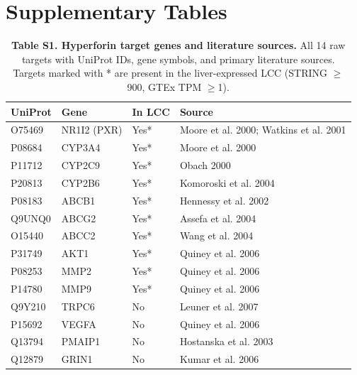 \clearpage
\section*{Supplementary Tables}

\begin{table}[ht]
\centering
\caption{\textbf{Table S1. Hyperforin target genes and literature sources.}
All 14 raw targets with UniProt IDs, gene symbols, and primary literature sources.
Targets marked with * are present in the liver-expressed LCC (STRING $\geq$900, GTEx TPM $\geq$1).}
\label{tab:S1}
\vspace{0.5em}
\small
\begin{tabular}{llll}
\toprule
\textbf{UniProt} & \textbf{Gene} & \textbf{In LCC} & \textbf{Source} \\
\midrule
O75469 & NR1I2 (PXR) & Yes* & Moore et al. 2000; Watkins et al. 2001 \\
P08684 & CYP3A4 & Yes* & Moore et al. 2000 \\
P11712 & CYP2C9 & Yes* & Obach 2000 \\
P20813 & CYP2B6 & Yes* & Komoroski et al. 2004 \\
P08183 & ABCB1 & Yes* & Hennessy et al. 2002 \\
Q9UNQ0 & ABCG2 & Yes* & Assefa et al. 2004 \\
O15440 & ABCC2 & Yes* & Wang et al. 2004 \\
P31749 & AKT1 & Yes* & Quiney et al. 2006 \\
P08253 & MMP2 & Yes* & Quiney et al. 2006 \\
P14780 & MMP9 & Yes* & Quiney et al. 2006 \\
Q9Y210 & TRPC6 & No & Leuner et al. 2007 \\
P15692 & VEGFA & No & Quiney et al. 2006 \\
Q13794 & PMAIP1 & No & Hostanska et al. 2003 \\
Q12879 & GRIN1 & No & Kumar et al. 2006 \\
\bottomrule
\end{tabular}
\end{table}

